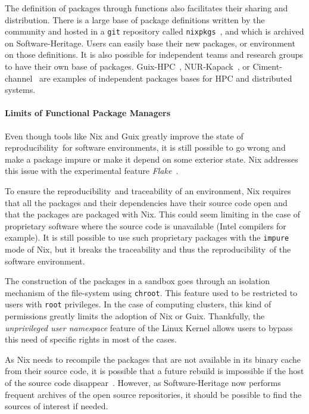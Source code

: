 \documentclass[sigconf,natbib=false]{acmart}
\newcommand{\repro}{reproducibility}
\begin{document}
The definition of packages through functions also facilitates their sharing and distribution.
There is a large base of package definitions written by the community and hosted in a \texttt{git} repository called \texttt{nixpkgs}\ \cite{nixpkgs, repology}, and which is archived on Software-Heritage.
Users can easily base their new packages, or environment on those definitions.
It is also possible for independent teams and research groups to have their own base of packages.
Guix-HPC\ \cite{guix-hpc}, NUR-Kapack\ \cite{kapack}, or Ciment-channel\ \cite{ciment_channel} are examples of independent packages bases for HPC and distributed systems.

\paragraph{Limits of Functional Package Managers}

Even though tools like Nix and Guix greatly improve the state of \repro\ for software environments, it is still possible to go wrong and make a package impure or make it depend on some exterior state.
Nix addresses this issue with the experimental feature \emph{Flake}\ \cite{flakes}.

To ensure the \repro\ and traceability of an environment, Nix requires that all the packages and their dependencies have their source code open and that the packages are packaged with Nix.
This could seem limiting in the case of proprietary software where the source code is unavailable (Intel compilers for example).
It is still possible to use such proprietary packages with the \texttt{impure} mode of Nix, but it breaks the traceability and thus the \repro\ of the software environment. 

The construction of the packages in a sandbox goes through an isolation mechanism of the file-system using \texttt{chroot}.
This feature used to be restricted to users with \texttt{root} privileges.
In the case of computing clusters, this kind of permissions greatly limits the adoption of Nix or Guix.
Thankfully, the \emph{unprivileged user namespace} feature of the Linux Kernel allows users to bypass this need of specific rights in most of the cases.

As Nix needs to recompile the packages that are not available in its binary cache from their source code, it is possible that a future rebuild is impossible if the host of the source code disappear\ \cite{blinry}.
However, as Software-Heritage now performs frequent archives of the open source repositories, it should be possible to find the sources of interest if needed.
\end{document}
